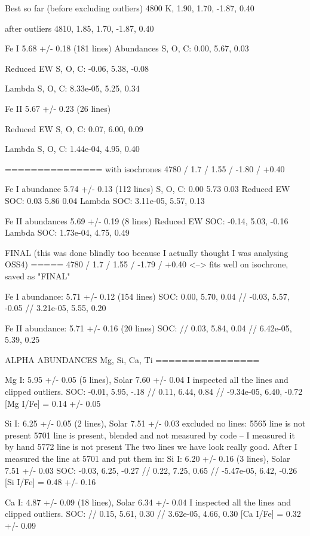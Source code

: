\documentclass{emulateapj}
\begin{document}
Best so far (before excluding outliers)
4800 K, 1.90, 1.70, -1.87, 0.40

after outliers
4810, 1.85, 1.70, -1.87, 0.40

Fe I 5.68 +/- 0.18 (181 lines)
Abundances
S, O, C: 0.00, 5.67, 0.03

Reduced EW
S, O, C: -0.06, 5.38, -0.08

Lambda S, O, C: 8.33e-05, 5.25, 0.34

Fe II 5.67 +/- 0.23 (26 lines)

Reduced EW S, O, C: 0.07, 6.00, 0.09

Lambda S, O, C: 1.44e-04, 4.95, 0.40


===============
with isochrones
4780 / 1.7 / 1.55 / -1.80 / +0.40

Fe I abundance 5.74 +/- 0.13 (112 lines)
S, O, C: 0.00 5.73 0.03
Reduced EW SOC: 0.03 5.86 0.04
Lambda SOC: 3.11e-05, 5.57, 0.13

Fe II abundances 5.69 +/- 0.19 (8 lines)
Reduced EW SOC: -0.14, 5.03, -0.16
Lambda SOC: 1.73e-04, 4.75, 0.49

FINAL (this was done blindly too because I actually thought I was analysing OSS4)
=====
4780 / 1.7 / 1.55 / -1.79 / +0.40 <--> fits well on isochrone, saved as "FINAL"

Fe I abundance: 5.71 +/- 0.12 (154 lines)
SOC: 0.00, 5.70, 0.04 // -0.03, 5.57, -0.05 // 3.21e-05, 5.55, 0.20

Fe II abundance: 5.71 +/- 0.16 (20 lines)
SOC: // 0.03, 5.84, 0.04 // 6.42e-05, 5.39, 0.25

ALPHA ABUNDANCES Mg, Si, Ca, Ti
================

Mg I: 5.95 +/- 0.05 (5 lines), Solar 7.60 +/- 0.04
I inspected all the lines and clipped outliers.
SOC: -0.01, 5.95, -.18 // 0.11, 6.44, 0.84 // -9.34e-05, 6.40, -0.72
[Mg I/Fe] = 0.14 +/- 0.05

Si I: 6.25 +/- 0.05 (2 lines), Solar 7.51 +/- 0.03
excluded no lines:
5565 line is not present
5701 line is present, blended and not measured by code -- I measured it by hand
5772 line is not present
The two lines we have look really good.
After I measured the line at 5701 and put them in:
Si I: 6.20 +/- 0.16 (3 lines), Solar 7.51 +/- 0.03
SOC: -0.03, 6.25, -0.27 // 0.22, 7.25, 0.65 // -5.47e-05, 6.42, -0.26
[Si I/Fe] = 0.48 +/- 0.16

Ca I: 4.87 +/- 0.09 (18 lines), Solar 6.34 +/- 0.04
I inspected all the lines and clipped outliers.
SOC: // 0.15, 5.61, 0.30 // 3.62e-05, 4.66, 0.30
[Ca I/Fe] = 0.32 +/- 0.09
\end{document}
